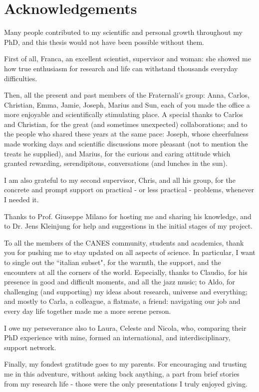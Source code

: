 \chapter*{Acknowledgements}
%
\begin{onehalfspacing}
Many people contributed to my scientific and personal growth throughout my PhD, and this thesis would not have been possible without them.

First of all, Franca, an excellent scientist, supervisor and woman: she showed me how true enthusiasm for research and life can withstand thousands everyday difficulties.

Then, all the present and past members of the Fraternali's group: Anna, Carlos, Christian, Emma, Jamie, Joseph, Marius and Sun, each of you made the office a more enjoyable and scientifically stimulating place. A special thanks to Carlos and Christian, for the great (and sometimes unexpected) collaborations; and to the people who shared these years at the same pace: Joseph, whose cheerfulness made working days and scientific discussions more pleasant (not to mention the treats he supplied), and Marius, for the curious and caring attitude which granted rewarding, serendipitous, conversations (and lunches in the sun).

I am also grateful to my second supervisor, Chris, and all his group, for the concrete and prompt support on practical - or less practical - problems, whenever I needed it.

Thanks to Prof. Giuseppe Milano for hosting me and sharing his knowledge, and to Dr. Jens Kleinjung for help and suggestions in the initial stages of my project.

To all the members of the CANES community, students and academics, thank you for pushing me to stay updated on all aspects of science. In particular, I want to single out the ``italian subset", for the warmth, the support, and the encounters at all the corners of the world. Especially, thanks to Claudio, for his presence in good and difficult moments, and all the jazz music; to Aldo, for challenging (and supporting) my ideas about research, universe and everything; and mostly to Carla, a colleague, a flatmate, a friend: navigating our job and every day life together made me a more serene person.

I owe my perseverance also to Laura, Celeste and Nicola, who, comparing their PhD experience with mine, formed an international, and interdisciplinary, support network.

Finally, my fondest gratitude goes to my parents. For encouraging and trusting me in this adventure, without asking back anything, a part from brief stories from my research life - those were the only presentations I truly enjoyed giving.

\end{onehalfspacing}


